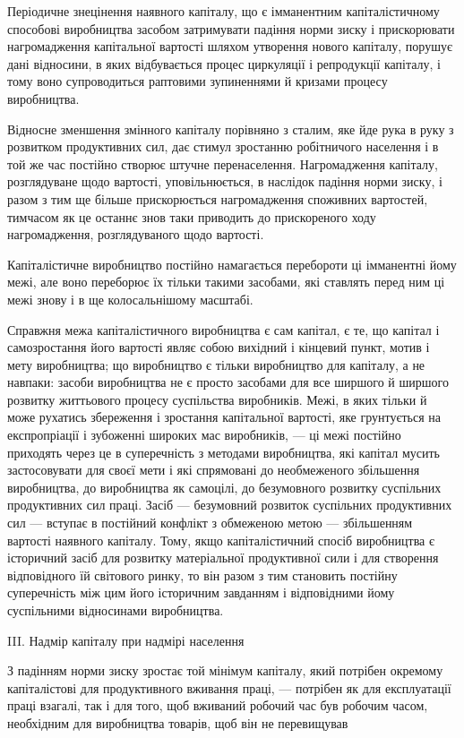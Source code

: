 Періодичне знецінення наявного капіталу, що є імманентним
капіталістичному способові виробництва засобом затримувати
падіння норми зиску і прискорювати нагромадження капітальної
вартості шляхом утворення нового капіталу, порушує дані відносини,
в яких відбувається процес циркуляції і репродукції
капіталу, і тому воно супроводиться раптовими зупиненнями й
кризами процесу виробництва.

Відносне зменшення змінного капіталу порівняно з сталим,
яке йде рука в руку з розвитком продуктивних сил, дає стимул
зростанню робітничого населення і в той же час постійно створює
штучне перенаселення. Нагромадження капіталу, розглядуване
щодо вартості, уповільнюється, в наслідок падіння норми зиску, і
разом з тим ще більше прискорюється нагромадження споживних
вартостей, тимчасом як це останнє знов таки приводить до прискореного
ходу нагромадження, розглядуваного щодо вартості.

Капіталістичне виробництво постійно намагається перебороти
ці імманентні йому межі, але воно переборює їх тільки такими
засобами, які ставлять перед ним ці межі знову і в ще колосальнішому
масштабі.

Справжня межа капіталістичного виробництва є сам капітал,
є те, що капітал і самозростання його вартості являє собою
вихідний і кінцевий пункт, мотив і мету виробництва; що виробництво
є тільки виробництво для капіталу, а не навпаки:
засоби виробництва не є просто засобами для все ширшого й
ширшого розвитку життьового процесу суспільства виробників.
Межі, в яких тільки й може рухатись збереження і зростання
капітальної вартості, яке грунтується на експропріації і зубоженні
широких мас виробників, — ці межі постійно приходять
через це в суперечність з методами виробництва, які капітал
мусить застосовувати для своєї мети і які спрямовані до необмеженого
збільшення виробництва, до виробництва як самоцілі, до безумовного
розвитку суспільних продуктивних сил праці. Засіб —
безумовний розвиток суспільних продуктивних сил — вступає
в постійний конфлікт з обмеженою метою — збільшенням вартості
наявного капіталу. Тому, якщо капіталістичний спосіб виробництва
є історичний засіб для розвитку матеріальної продуктивної
сили і для створення відповідного їй світового ринку, то
він разом з тим становить постійну суперечність між цим його
історичним завданням і відповідними йому суспільними відносинами
виробництва.

III. Надмір капіталу при надмірі населення

З падінням норми зиску зростає той мінімум капіталу, який
потрібен окремому капіталістові для продуктивного вживання
праці, — потрібен як для експлуатації праці взагалі, так і для
того, щоб вживаний робочий час був робочим часом, необхідним
для виробництва товарів, щоб він не перевищував
\parbreak{}  %
